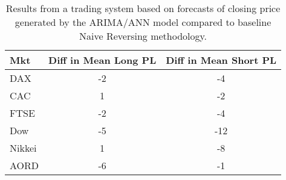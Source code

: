 \begin{table}[ht]
\centering
\caption[ARIMA/ANN predictions passed to System 1 compared to Naive Reversing methodology]{Results from a trading system based on forecasts of closing price generated by the ARIMA/ANN model compared to baseline Naive Reversing methodology.} 
\label{tab:chp_ts:arima_ann_sys1_diff}
\begin{tabular}{lcc}
  \toprule Mkt & Diff in Mean Long PL & Diff in Mean Short PL \\ 
  \midrule DAX & -2 & -4 \\ 
  CAC & 1 & -2 \\ 
  FTSE & -2 & -4 \\ 
  Dow & -5 & -12 \\ 
  Nikkei & 1 & -8 \\ 
  AORD & -6 & -1 \\ 
   \bottomrule \end{tabular}
\end{table}
